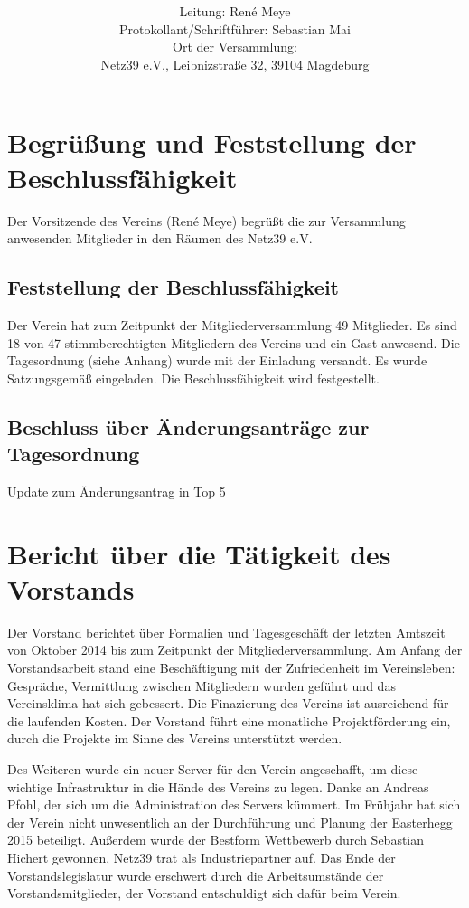 \documentclass[a4paper,12pt,titlepage]{scrartcl}
\title{ \logo \\ \vspace{0.2\baselineskip} \thetitle}
\author{
Leitung: René Meye\\
Protokollant/Schriftführer: Sebastian Mai \\
Ort der Versammlung:\\ Netz39 e.V., Leibnizstraße 32, 39104 Magdeburg \\
}
\date{\displaydate{date}} %
\begin{document}
\maketitle
\tableofcontents

\clearpage
\section{Begrüßung und Feststellung der Beschlussfähigkeit}
Der Vorsitzende des Vereins (René Meye) begrüßt die zur Versammlung anwesenden Mitglieder in den Räumen des Netz39 e.V.

\subsection{Feststellung der Beschlussfähigkeit}

Der Verein hat zum Zeitpunkt der Mitgliederversammlung 49 Mitglieder. Es sind 18 von 47 stimmberechtigten Mitgliedern des Vereins und ein Gast anwesend. Die Tagesordnung (siehe Anhang) wurde mit der Einladung versandt. Es wurde Satzungsgemäß eingeladen. Die Beschlussfähigkeit wird festgestellt.

\subsection{Beschluss über Änderungsanträge zur Tagesordnung}
Update zum Änderungsantrag in Top 5

\section{Bericht über die Tätigkeit des Vorstands}
Der Vorstand berichtet über Formalien und Tagesgeschäft der letzten Amtszeit von Oktober 2014 bis zum Zeitpunkt der Mitgliederversammlung.
Am Anfang der Vorstandsarbeit stand eine Beschäftigung mit der Zufriedenheit im Vereinsleben: Gespräche, Vermittlung zwischen Mitgliedern wurden geführt und das Vereinsklima hat sich gebessert.
Die Finazierung des Vereins ist ausreichend für die laufenden Kosten. Der Vorstand führt eine monatliche Projektförderung ein, durch die Projekte im Sinne des Vereins unterstützt werden.

Des Weiteren wurde ein neuer Server für den Verein angeschafft, um diese wichtige Infrastruktur in die Hände des Vereins zu legen. Danke an Andreas Pfohl, der sich um die Administration des Servers kümmert.
Im Frühjahr hat sich der Verein nicht unwesentlich an der Durchführung und Planung der Easterhegg 2015 beteiligt. Außerdem wurde der Bestform Wettbewerb durch Sebastian Hichert gewonnen, Netz39 trat als Industriepartner auf.
Das Ende der Vorstandslegislatur wurde erschwert durch die Arbeitsumstände der Vorstandsmitglieder, der Vorstand entschuldigt sich dafür beim Verein.
\end{document}
